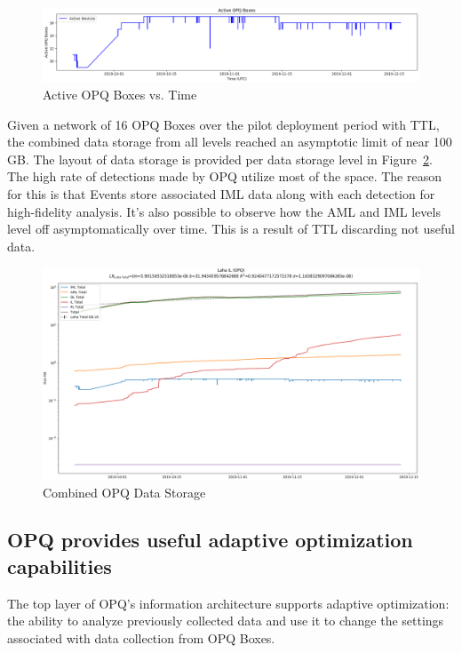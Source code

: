 \begin{figure}[ht]
    \centering
    \includegraphics[width=0.75\linewidth]{images/pilot/active-opq-boxes.png}
    \caption{Active OPQ Boxes vs. Time}
    \label{fig:active-opq-boxes}
\end{figure}

Given a network of 16 OPQ Boxes over the pilot deployment period with TTL, the combined data storage from all levels reached an asymptotic limit of near 100 GB. The layout of data storage is provided per data storage level in Figure~\ref{fig:opq-data-storage}. The high rate of detections made by OPQ utilize most of the space. The reason for this is that Events store associated IML data along with each detection for high-fidelity analysis. It's also possible to observe how the AML and IML levels level off asymptomatically over time. This is a result of TTL discarding not useful data.

\begin{figure}[ht]
    \centering
    \includegraphics[width=0.75\linewidth]{images/pilot/laha-levels-storage.png}
    \caption{Combined OPQ Data Storage}
    \label{fig:opq-data-storage}
\end{figure}

\subsection{OPQ provides useful adaptive optimization capabilities}
\label{sec:adaptive-optimization}

The top layer of OPQ's information architecture supports adaptive optimization: the ability to analyze previously collected data and use it to change the settings associated with data collection from OPQ Boxes.

